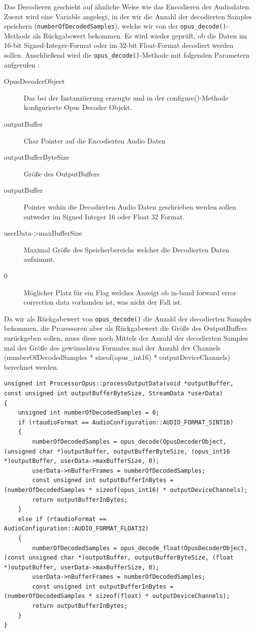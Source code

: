 Das Decodieren geschieht auf ähnliche Weise wie das Encodieren der Audiodaten.
Zuerst wird eine Variable angelegt, in der wir die Anzahl der decodierten Samples speichern (\texttt{numberOfDecodedSamples}), welche wir von der \texttt{opus\_decode()}-Methode als Rückgabewert bekommen. Es wird wieder geprüft, ob die Daten im 16-bit Signed-Integer-Format oder im 32-bit Float-Format decodiert werden sollen. Anschließend wird die \texttt{opus\_decode()}-Methode mit folgenden Parametern aufgerufen :

\begin{description}
\item[OpusDecoderObject] Das bei der Instanziierung erzeugte und in der configure()-Methode konfigurierte Opus Decoder Objekt.
\item[outputBuffer] Char Pointer auf die Encodierten Audio Daten
\item[outputBufferByteSize] Größe des OutputBuffers
\item[outputBuffer] Pointer wohin die Decodierten Audio Daten geschrieben werden sollen entweder im Signed Integer 16 oder Float 32 Format.
\item[userData->maxBufferSize] Maximal Größe des Speicherbereichs welcher die Decodierten Daten aufnimmt.
\item[0] Möglicher Platz für ein Flag welches Anzeigt ob in-band forward error correction data vorhanden ist, was nicht der Fall ist.
\end{description}

Da wir als Rückgabewert von \texttt{opus\_decode()} die Anzahl der decodierten Samples bekommen, die Prozessoren aber als Rückgabewert die Größe des OutputBuffers zurückgeben sollen, muss diese noch Mittels der Anzahl der decodierten Samples mal der Größe des gewünschten Formates mal der Anzahl der Channels (numberOfDecodedSamples * sizeof(opus\_int16) * outputDeviceChannels) berechnet werden.

\begin{lstlisting}[caption={Decodieren von Audio Daten mittels Opus},label={Code:Opus}]
unsigned int ProcessorOpus::processOutputData(void *outputBuffer, const unsigned int outputBufferByteSize, StreamData *userData)
{
    unsigned int numberOfDecodedSamples = 0;
    if (rtaudioFormat == AudioConfiguration::AUDIO_FORMAT_SINT16)
    {
        numberOfDecodedSamples = opus_decode(OpusDecoderObject, (unsigned char *)outputBuffer, outputBufferByteSize, (opus_int16 *)outputBuffer, userData->maxBufferSize, 0);
        userData->nBufferFrames = numberOfDecodedSamples;
        const unsigned int outputBufferInBytes = (numberOfDecodedSamples * sizeof(opus_int16) * outputDeviceChannels);
        return outputBufferInBytes;
    }
    else if (rtaudioFormat == AudioConfiguration::AUDIO_FORMAT_FLOAT32)
    {
        numberOfDecodedSamples = opus_decode_float(OpusDecoderObject, (const unsigned char *)outputBuffer, outputBufferByteSize, (float *)outputBuffer, userData->maxBufferSize, 0);
        userData->nBufferFrames = numberOfDecodedSamples;
        const unsigned int outputBufferInBytes = (numberOfDecodedSamples * sizeof(float) * outputDeviceChannels);
        return outputBufferInBytes;
    }
}
\end{lstlisting}

